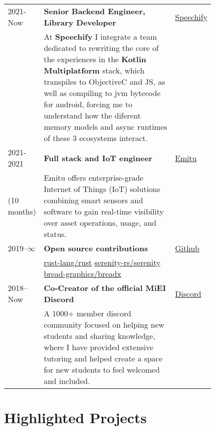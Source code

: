 \documentclass{article}
\begin{document}
\begin{tabular}{p{0.11\linewidth}p{0.73\linewidth}l}
    2021-Now & \textbf{Senior Backend Engineer, Library Developer} & \href{https://speechify.com}{Speechify} \\
    &
        At \textbf{Speechify} I integrate a team dedicated to rewriting the core
        of the experiences in the \textbf{Kotlin Multiplatform} stack, which transpiles to
        ObjectiveC and JS, as well as compiling to jvm bytecode for android, forcing
        me to understand how the diferent memory models and async runtimes of these
        3 ecosystems interact. & \\

    2021-2021 & \textbf{Full stack and IoT engineer} & \href{https://emitu.com}{Emitu} \\
    (10 months) &
        Emitu offers enterprise-grade Internet of Things (IoT) solutions combining
        smart sensors and software to gain real-time visibility over asset
        operations, usage, and status. & \\

    2019--$\infty$ & \textbf{Open source contributions} & \href{https://github.com}{Github} \\
    &
        \href{https://github.com/rust-lang/rust/pulls?q=author\%3Amendess+}
            {rust-lang/rust}
        \hspace{2em}
        \href{https://github.com/serenity-rs/serenity/pulls?q=author\%3Amendess+}
            {serenity-rs/serenity}
        \hspace{2em}
        \href{https://github.com/bread-graphics/breadx/pulls?q=author\%3Amendess+}
            {bread-graphics/breadx} & \\

    2018--Now & \textbf{Co-Creator of the official MiEI Discord} & \href{discord.com}{Discord} \\
    &
        A 1000+ member discord community focused on helping new students and
        sharing knowledge, where I have provided extensive tutoring and helped
        create a space for new students to feel welcomed and included. & \\

\end{tabular}

\section{Highlighted Projects}
\end{document}
